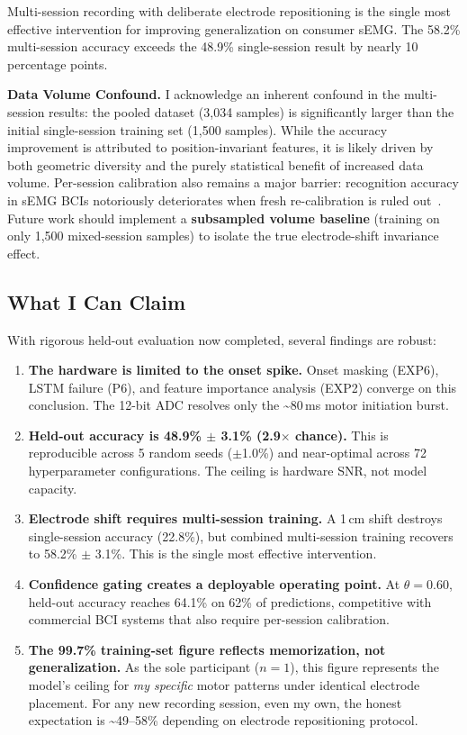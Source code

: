 \documentclass{article}
\begin{document}
Multi-session recording with deliberate electrode repositioning is the single most effective intervention for improving generalization on consumer sEMG. The 58.2\% multi-session accuracy exceeds the 48.9\% single-session result by nearly 10 percentage points.

\textbf{Data Volume Confound.} I acknowledge an inherent confound in the multi-session results: the pooled dataset (3,034 samples) is significantly larger than the initial single-session training set (1,500 samples). While the accuracy improvement is attributed to position-invariant features, it is likely driven by both geometric diversity and the purely statistical benefit of increased data volume. Per-session calibration also remains a major barrier: recognition accuracy in sEMG BCIs notoriously deteriorates when fresh re-calibration is ruled out~\cite{yousefi2022}. Future work should implement a \textbf{subsampled volume baseline} (training on only 1,500 mixed-session samples) to isolate the true electrode-shift invariance effect.

\subsection{What I Can Claim}
\label{sec:claims}

With rigorous held-out evaluation now completed, several findings are robust:

\begin{enumerate}
    \item \textbf{The hardware is limited to the onset spike.} Onset masking (EXP6), LSTM failure (P6), and feature importance analysis (EXP2) converge on this conclusion. The 12-bit ADC resolves only the \textasciitilde80\,ms motor initiation burst.

    \item \textbf{Held-out accuracy is 48.9\% $\pm$ 3.1\% (2.9$\times$ chance).} This is reproducible across 5 random seeds ($\pm$1.0\%) and near-optimal across 72 hyperparameter configurations. The ceiling is hardware SNR, not model capacity.

    \item \textbf{Electrode shift requires multi-session training.} A 1\,cm shift destroys single-session accuracy (22.8\%), but combined multi-session training recovers to 58.2\% $\pm$ 3.1\%. This is the single most effective intervention.

    \item \textbf{Confidence gating creates a deployable operating point.} At $\theta = 0.60$, held-out accuracy reaches 64.1\% on 62\% of predictions, competitive with commercial BCI systems that also require per-session calibration.

    \item \textbf{The 99.7\% training-set figure reflects memorization, not generalization.} As the sole participant ($n=1$), this figure represents the model's ceiling for \emph{my specific} motor patterns under identical electrode placement. For any new recording session, even my own, the honest expectation is \textasciitilde49--58\% depending on electrode repositioning protocol.
\end{enumerate}
\end{document}
